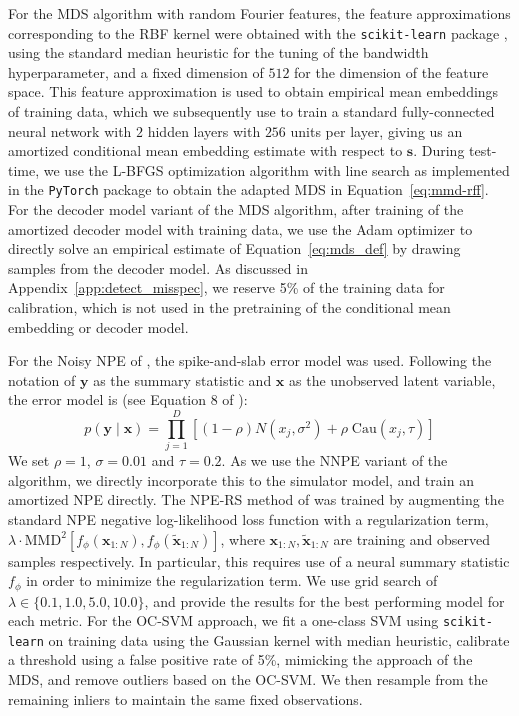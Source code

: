 \documentclass{article}
\theoremstyle{plain}
\theoremstyle{definition}
\theoremstyle{remark}
\begin{document}
For the MDS algorithm with random Fourier features, the feature approximations corresponding to the RBF kernel were obtained with the \texttt{scikit-learn} package \citep{pedregosaScikitlearnMachineLearning2011}, using the standard median heuristic for the tuning of the bandwidth hyperparameter, and a fixed dimension of \( 512 \) for the dimension of the feature space. This feature approximation is used to obtain empirical mean embeddings of training data, which we subsequently use to train a standard fully-connected neural network with \( 2 \) hidden layers with \( 256 \) units per layer, giving us an amortized conditional mean embedding estimate with respect to \( \mathbf{s} \). During test-time, we use the L-BFGS optimization algorithm \citep{liuLimitedMemoryBFGS1989} with line search as implemented in the \texttt{PyTorch} package \citep{paszkePyTorchImperativeStyle2019} to obtain the adapted MDS in Equation~\ref{eq:mmd-rff}. For the decoder model variant of the MDS algorithm, after training of the amortized decoder model with training data, we use the Adam optimizer \citep{kingmaAdamMethodStochastic2015} to directly solve an empirical estimate of Equation~\ref{eq:mds_def} by drawing samples from the decoder model. As discussed in Appendix~\ref{app:detect_misspec}, we reserve 5\% of the training data for calibration, which is not used in the pretraining of the conditional mean embedding or decoder model.

For the Noisy NPE of \citet{wardRobustNeuralPosterior2022a}, the spike-and-slab error model was used. Following the notation of \( \mathbf{y} \) as the summary statistic and \( \mathbf{x} \) as the unobserved latent variable, the error model is (see Equation 8 of \citet{wardRobustNeuralPosterior2022a}):
\[
p(\mathbf{y} \mid \mathbf{x} ) = \prod_{j=1}^D [(1-\rho) N(x_j, \sigma^2) + \rho \; \mathrm{Cau}(x_j, \tau)]
\]
We set \( \rho = 1\), \( \sigma = 0.01 \) and \( \tau = 0.2 \). As we use the NNPE variant of the algorithm, we directly incorporate this to the simulator model, and train an amortized NPE directly. The NPE-RS method of \citet{huangLearningRobustStatistics2023g} was trained by augmenting the standard NPE negative log-likelihood loss function with a regularization term, \( \lambda \cdot \mathrm{MMD}^2[f_\phi(\mathbf{x}_{1:N}), f_\phi(\tilde{\mathbf{x}}_{1:N})] \), where \( \mathbf{x}_{1:N}, \tilde{\mathbf{x}}_{1:N} \) are training and observed samples respectively. In particular, this requires use of a neural summary statistic \( f_\phi \) in order to minimize the regularization term. We use grid search of \( \lambda \in \{0.1, 1.0,5.0, 10.0\} \), and provide the results for the best performing model for each metric. For the OC-SVM \citep{scholkopfEstimatingSupportHighDimensional2001} approach, we fit a one-class SVM using \texttt{scikit-learn} \citep{pedregosaScikitlearnMachineLearning2011} on training data using the Gaussian kernel with median heuristic, calibrate a threshold using a false positive rate of 5\%, mimicking the approach of the MDS, and remove outliers based on the OC-SVM. We then resample from the remaining inliers to maintain the same fixed observations. 
\end{document}
